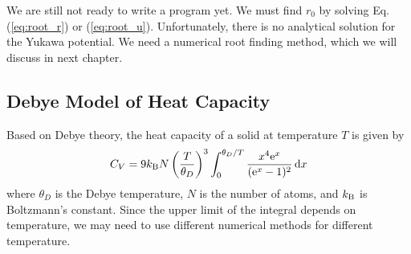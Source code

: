 We are still not ready to write a program yet.  We must find $r_0$ by solving Eq. (\ref{eq:root_r}) or (\ref{eq:root_u}). Unfortunately, there is no analytical solution for the Yukawa potential.  We need a numerical root finding method, which we will discuss in next chapter.


\subsection{Debye Model of Heat Capacity}\label{sec:debye}

Based on Debye theory, the heat capacity of a solid at temperature $T$ is given by
%
\begin{equation}\label{eq:debye}
C_V = 9 k_\text{B} N \left ( \frac{T}{\theta_D} \right )^3 \int_0^{\theta_D/T} \frac{x^4 \text{e}^x}{(\text{e}^x-1)^2} \dd{x}
\end{equation}
%
where $\theta_D$ is the Debye temperature, $N$ is the number of atoms, and $k_\text{B}$ is Boltzmann's constant.\cite{heat_phonon} 
Since the upper limit of the integral depends on temperature, we may need to use different numerical methods for different temperature.
 
